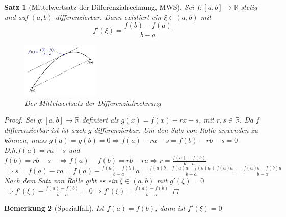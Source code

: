 \documentclass[a4paper,titlepage,oneside]{article}
\def\R{\ensuremath{\mathbb{R}} }
\theoremstyle{thmstyle}
\newtheorem{satz}{Satz}[section]
\newtheorem{bem}[satz]{Bemerkung}
\theoremstyle{subthmstyle}
\begin{document}
\begin{satz}[Mittelwertsatz der Differenzialrechnung, MWS]
Sei $f : [a,b] \to \R $ stetig und auf $(a,b)$ differenzierbar. Dann existiert ein $\xi \in (a,b)$ mit \[f'(\xi) = \frac{f(b) - f(a)}{b-a}\]
\begin{figure}[ht]\centering
 \includegraphics[width=0.33\textwidth]{images/Mittelwertsatz.png}
\caption{Der Mittelwertsatz der Differenzialrechnung}
\end{figure}
\begin{proof}
Sei $g: [a,b]\to \R$ definiert als $g(x) = f(x) - rx - s$, mit $r,s \in \R$. Da $f$ differenzierbar ist ist auch $g$ differenzierbar. Um den Satz von Rolle anwenden zu können, muss $g(a) = g(b) = 0 \Rightarrow f(a) - r a - s = f(b) - r b - s = 0 $\\
D.h.$  f(a) = r a - s $ und $\displaystyle f(b) = r b - s \quad \Rightarrow f(a) - f(b) = rb - ra \Rightarrow r = \frac{f(a) - f(b)}{b - a}$ \\
$ \displaystyle \Rightarrow s = f(a) - ra = f(a) -  \frac{f(a) - f(b)}{b - a} a = \frac{f(a) b - f(a) a - f(b) a + f(a) a}{b-a} = \frac{f(a)b - f(b)a}{b - a}$\\
Nach dem Satz von Rolle gibt es ein $\xi \in (a,b)$ mit $g'(\xi) = 0$\\
$ \displaystyle \Rightarrow f'(\xi) -  \frac{f(a) - f(b)}{b - a} = 0 \Rightarrow f'(\xi) =  \frac{f(a) - f(b)}{b - a}$
\end{proof}
\end{satz}

\begin{bem}[Spezialfall]
Ist $f(a) = f(b)$, dann ist $f'(\xi) = 0$
\end{bem}
\end{document}
